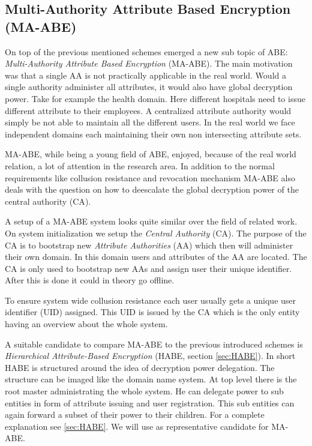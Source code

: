 \subsection{Multi-Authority Attribute Based Encryption (MA-ABE)}
On top of the previous mentioned schemes emerged a new sub topic of \ac{ABE}: \textit{Multi-Authority Attribute Based Encryption} (\ac{MA-ABE}). The main motivation was that a single \ac{AA} is not practically applicable in the real world. Would a single authority administer all attributes, it would also have global decryption power. Take for example the health domain. Here different hospitals need to issue different attribute to their employees. A centralized attribute authority would simply be not able to maintain all the different users. In the real world we face independent domains each maintaining their own non intersecting attribute sets. 

\ac{MA-ABE}, while being a young field of \ac{ABE}, enjoyed, because of the real world relation, a lot of attention in the research area. In addition to the normal requirements like collusion resistance and revocation mechanism \ac{MA-ABE} also deals with the question on how to deescalate the global decryption power of the central authority (\ac{CA}). 

A setup of a \ac{MA-ABE} system looks quite similar over the field of related work. On system initialization we setup the \textit{Central Authority} (\ac{CA}). The purpose of the \ac{CA} is to bootstrap new \textit{Attribute Authorities} (\ac{AA}) which then will administer their own domain. In this domain users and attributes of the \ac{AA} are located. The CA is only used to bootstrap new AAs and assign user their unique identifier. After this is done it could in theory go offline. 

To ensure system wide collusion resistance each user usually gets a unique user identifier (\ac{UID}) assigned. This \ac{UID} is issued by the \ac{CA} which is the only entity having an overview about the whole system. 

A suitable candidate to compare \ac{MA-ABE} to the previous introduced schemes is \textit{Hierarchical Attribute-Based Encryption} (\ac{HABE}, section \ref{sec:HABE}). In short \ac{HABE} is structured around the idea of decryption power delegation. The structure can be imaged like the domain name system. At top level there is the root master administrating the whole system. He can delegate power to sub entities in form of attribute issuing and user registration. This sub entities can again forward a subset of their power to their children. For a complete explanation see \ref{sec:HABE}. We will use \cite{Wang:2010:HAE:1866307.1866414} as representative candidate for \ac{MA-ABE}. 

